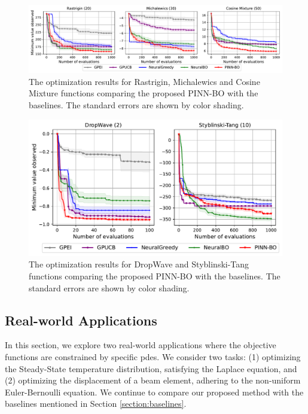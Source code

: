 \begin{figure}[] %
  \centering
  \includegraphics[width=\textwidth]{Figures/PINN-BO/pinn-bo_synthetic.pdf} 
  \caption{The optimization results for Rastrigin, Michalewics and Cosine Mixture functions comparing the proposed PINN-BO with the baselines. The standard errors are shown by color shading.}
  \label{fig:pinn-bo_synthetic}
\end{figure}

\begin{figure}[] %
  \centering
  \includegraphics[width=\textwidth]{Figures/PINN-BO/pinn-bo_additional_synthetic.pdf} 
  \caption{The optimization results for DropWave and Styblinski-Tang functions comparing the proposed PINN-BO with the baselines. The standard errors are shown by color shading.}
  \label{fig:pinn-bo_additional_synthetic}
\end{figure}



\subsection{Real-world Applications}
In this section, we explore two real-world applications where the objective functions are constrained by specific \acp{pde}. We consider two tasks: (1) optimizing the Steady-State temperature distribution, satisfying the  Laplace equation, and (2) optimizing the displacement of a beam element, adhering to the non-uniform Euler-Bernoulli equation. We continue to compare our proposed method with the baselines mentioned in Section \ref{section:baselines}. 


